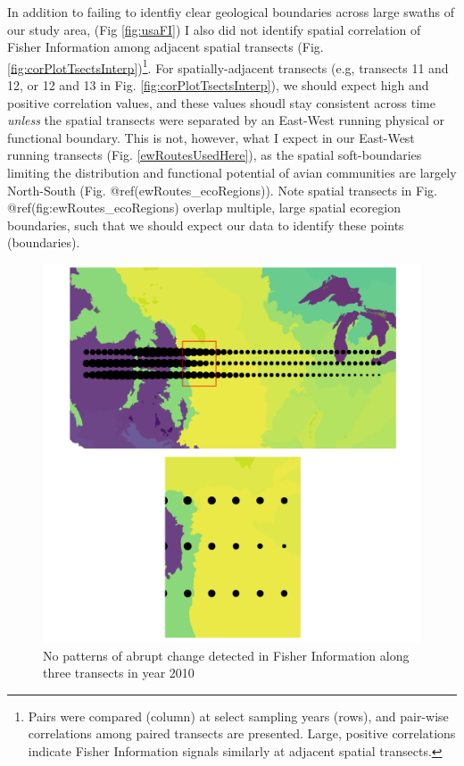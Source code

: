 \documentclass[12pt,twoside,openany]{reedthesis}
\begin{document}
In addition to failing to identfiy clear geological boundaries across large swaths of our study area, (Fig \ref{fig:usaFI}) I also did not identify spatial correlation of Fisher Information among adjacent spatial transects (Fig. \ref{fig:corPlotTsectsInterp})\footnote{Pairs were compared (column) at select sampling years (rows), and pair-wise correlations among paired transects are presented. Large, positive correlations indicate Fisher Information signals similarly at adjacent spatial transects.}. For spatially-adjacent transects (e.g, transects 11 and 12, or 12 and 13 in Fig. \ref{fig:corPlotTsectsInterp}), we should expect high and positive correlation values, and these values shoudl stay consistent across time \emph{unless} the spatial transects were separated by an East-West running physical or functional boundary. This is not, however, what I expect in our East-West running transects (Fig. \ref{ewRoutesUsedHere}), as the spatial soft-boundaries limiting the distribution and functional potential of avian communities are largely North-South (Fig. @ref(ewRoutes\_ecoRegions)). Note spatial transects in Fig. @ref(fig:ewRoutes\_ecoRegions) overlap multiple, large spatial ecoregion boundaries, such that we should expect our data to identify these points (boundaries).
\begin{figure}
\includegraphics[width=0.85\linewidth]{./chapterFiles/fisherSpatial/figures/figsCalledInDiss/scaledFiInterpolated_year2010_zoom_East-West} \caption{No patterns of abrupt change detected in Fisher Information along three transects in year 2010}\label{fig:fiEcoregion}
\end{figure}
\end{document}
